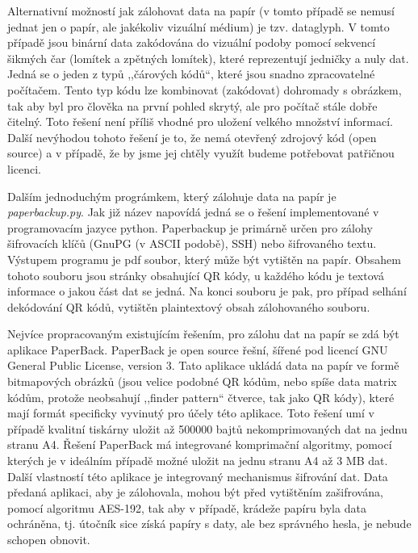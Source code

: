 \documentclass[conference]{IEEEtran}
\begin{document}

Alternativní možností jak zálohovat data na papír (v tomto případě se nemusí jednat jen o papír, ale jakékoliv vizuální médium) je tzv. dataglyph. V tomto případě jsou binární data zakódována do vizuální podoby pomocí sekvencí šikmých čar (lomítek a zpětných lomítek), které reprezentují jedničky a nuly dat. Jedná se o jeden z typů ,,čárových kódů``, které jsou snadno zpracovatelné počítačem. Tento typ kódu lze kombinovat (zakódovat) dohromady s obrázkem, tak aby byl pro člověka na první pohled skrytý, ale pro počítač stále dobře čitelný. Toto řešení není příliš vhodné pro uložení velkého množství informací. Další nevýhodou tohoto řešení je to, že nemá otevřený zdrojový kód (open source) a v případě, že by jsme jej chtěly využít budeme potřebovat patřičnou licenci.


Dalším jednoduchým prográmkem, který zálohuje data na papír je \emph{paperbackup.py}. Jak již název napovídá jedná se o řešení implementované v programovacím jazyce python. Paperbackup je primárně určen pro zálohy šifrovacích klíčů (GnuPG (v ASCII podobě), SSH) nebo šifrovaného textu. Výstupem programu je pdf soubor, který může být vytištěn na papír. Obsahem tohoto souboru jsou stránky obsahující QR kódy, u každého kódu je textová informace o jakou část dat se jedná. Na konci souboru je pak, pro případ selhání dekódování QR kódů, vytištěn plaintextový obsah zálohovaného souboru. 


Nejvíce propracovaným existujícím řešením, pro zálohu dat na papír se zdá být aplikace PaperBack. PaperBack je open source řešní, šířené pod licencí GNU General Public License, version 3. Tato aplikace ukládá data na papír ve formě bitmapových obrázků (jsou velice podobné QR kódům, nebo spíše data matrix kódům, protože neobsahují ,,finder pattern`` čtverce, tak jako QR kódy), které mají formát specificky vyvinutý pro účely této aplikace. Toto řešení umí v případě kvalitní tiskárny uložit až 500000 bajtů nekomprimovaných dat na jednu stranu A4. Řešení PaperBack má integrované komprimační algoritmy, pomocí kterých je v ideálním případě možné uložit na jednu stranu A4 až 3 MB dat. Další vlastností této aplikace je integrovaný mechanismus šifrování dat. Data předaná aplikaci, aby je zálohovala, mohou být před vytištěním zašifrována, pomocí algoritmu AES-192, tak aby v případě, krádeže papíru byla data ochráněna, tj. útočník sice získá papíry s daty, ale bez správného hesla, je nebude schopen obnovit.
\end{document}
